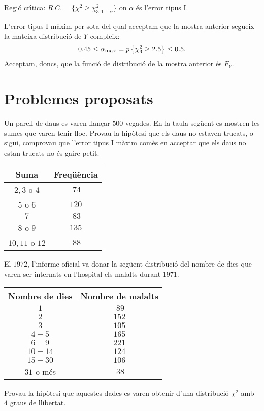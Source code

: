 {\begin{itemize}
Regi\'o cr\'{\i}tica: $R.C.=\{\chi^2\geq \chi_{3,1-\alpha}^2\}$ 
on $\alpha$ \'es l'error tipus I.

L'error tipus I m\`axim per sota del qual acceptam que la mostra anterior segueix 
la mateixa distribuci\'o de $Y$ compleix:
\[
0.45\leq \alpha_{\mbox{\footnotesize max}}=p\left\{\chi_3^2 \geq 2.5\right\}\leq 0.5.
\]
Acceptam, doncs, que la funci\'o de distribuci\'o
 de la mostra anterior \'es $F_Y$.
\end{itemize}
}

\section{Problemes proposats}

\begin{prob}
{Un parell de daus es varen llan\c{c}ar $500$ vegades. 
En la taula seg\"uent es
mostren les sumes que varen tenir lloc. Provau la hip\`otesi que els daus no
estaven trucats, o sigui, 
comprovau que l'error tipus I m\`axim com\`es
en acceptar que els daus no estan trucats no \'es gaire petit.
\begin{center}
\begin{tabular}{|c|c|}
\hline
Suma & Freq\"u\`encia \\\hline\hline
$2,3$ o $4$&$\ 74$\\\hline $5$ o
$6$&$120$\\\hline $7$&$\ 83$\\\hline $8$ o
$9$&$135$\\\hline $10,11$ o $12$&$\ 88$\\\hline
\end{tabular}
\end{center}
}
\end{prob}

\begin{prob}
{El $1972$, l'informe oficial va donar la seg\"uent distribuci\'o del
nombre de dies que varen ser internats en l'hospital els malalts durant
1971.
\begin{center}
\begin{tabular}{|c|c|}
\hline 
Nombre de dies & Nombre de malalts
\\\hline\hline
$1$&$\ 89$\\\hline $2$&$152$\\\hline 
$3$&$105$
\\\hline $4-5$&$165$\\\hline 
$6-9$&$221$\\\hline $10-14$&$124$\\\hline $15-30$
&$106$\\\hline $31$ o m\'es&$\ 38$\\\hline 
\end{tabular}
\end{center}

Provau la hip\`otesi que aquestes dades es varen obtenir d'una
distribuci\'o $\chi^2$ amb $4$ graus de llibertat.}
\end{prob} 

